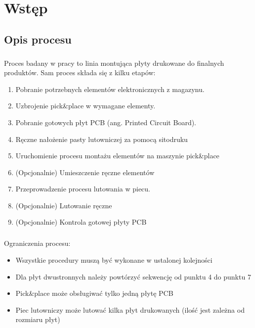 \chapter{Wstęp}

\section{Opis procesu}

\paragraph{}
Proces badany w pracy to linia montująca płyty drukowane do finalnych produktów. Sam proces składa się z kilku etapów:
\begin{enumerate}
	\item Pobranie potrzebnych elementów elektronicznych z magazynu.
	\item Uzbrojenie pick\&place w wymagane elementy.
	\item Pobranie gotowych płyt PCB (ang. Printed Circuit Board).
	\item Ręczne nałożenie pasty lutowniczej za pomocą sitodruku
	\item Uruchomienie procesu montażu elementów na maszynie pick\&place
	\item (Opcjonalnie) Umieszczenie ręczne elementów
	\item Przeprowadzenie procesu lutowania w piecu.
	\item (Opcjonalnie) Lutowanie ręczne
	\item (Opcjonalnie) Kontrola gotowej płyty PCB
\end{enumerate}

\paragraph{}
Ograniczenia procesu:
\begin{itemize}
	\item Wszystkie procedury muszą być wykonane w ustalonej kolejności
	\item Dla płyt dwustronnych należy powtórzyć sekwencję od punktu 4 do punktu 7
	\item Pick\&place może obsługiwać tylko jedną płytę PCB
	\item Piec lutowniczy może lutować kilka płyt drukowanych (ilość jest zależna od rozmiaru płyt)
\end{itemize}

